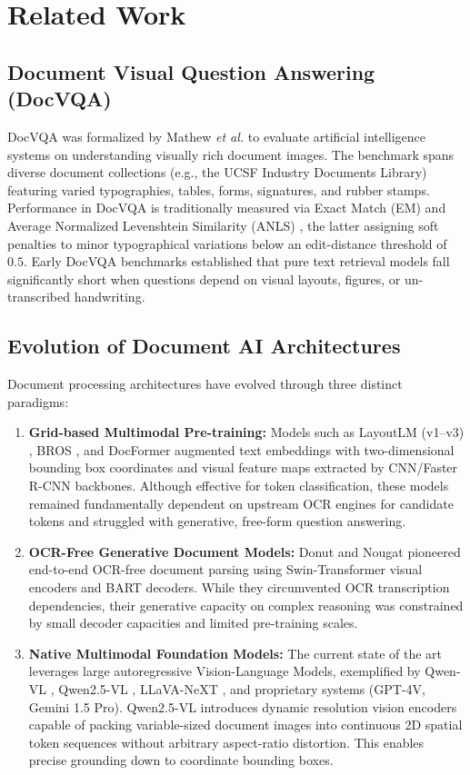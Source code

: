 \documentclass[conference]{IEEEtran}
\begin{document}
\section{Related Work}

\subsection{Document Visual Question Answering (DocVQA)}
DocVQA was formalized by Mathew \textit{et al.} \cite{b1} to evaluate artificial intelligence systems on understanding visually rich document images. The benchmark spans diverse document collections (e.g., the UCSF Industry Documents Library) featuring varied typographies, tables, forms, signatures, and rubber stamps. Performance in DocVQA is traditionally measured via Exact Match (EM) and Average Normalized Levenshtein Similarity (ANLS) \cite{b2}, the latter assigning soft penalties to minor typographical variations below an edit-distance threshold of $0.5$. Early DocVQA benchmarks established that pure text retrieval models fall significantly short when questions depend on visual layouts, figures, or un-transcribed handwriting.

\subsection{Evolution of Document AI Architectures}
Document processing architectures have evolved through three distinct paradigms:
\begin{enumerate}
    \item \textbf{Grid-based Multimodal Pre-training:} Models such as LayoutLM (v1--v3) \cite{b14, b15, b16}, BROS \cite{b17}, and DocFormer \cite{b7} augmented text embeddings with two-dimensional bounding box coordinates and visual feature maps extracted by CNN/Faster R-CNN backbones. Although effective for token classification, these models remained fundamentally dependent on upstream OCR engines for candidate tokens and struggled with generative, free-form question answering.
    \item \textbf{OCR-Free Generative Document Models:} Donut \cite{b18} and Nougat \cite{b19} pioneered end-to-end OCR-free document parsing using Swin-Transformer visual encoders and BART decoders. While they circumvented OCR transcription dependencies, their generative capacity on complex reasoning was constrained by small decoder capacities and limited pre-training scales.
    \item \textbf{Native Multimodal Foundation Models:} The current state of the art leverages large autoregressive Vision-Language Models, exemplified by Qwen-VL \cite{b20}, Qwen2.5-VL \cite{b10}, LLaVA-NeXT \cite{b21}, and proprietary systems (GPT-4V, Gemini 1.5 Pro). Qwen2.5-VL introduces dynamic resolution vision encoders capable of packing variable-sized document images into continuous 2D spatial token sequences without arbitrary aspect-ratio distortion. This enables precise grounding down to coordinate bounding boxes.
\end{enumerate}
\end{document}
